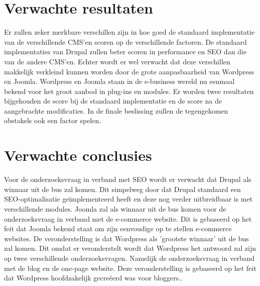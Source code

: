 \section{Verwachte resultaten}
\label{sec:verwachte_resultaten}
Er zullen zeker merkbare verschillen zijn in hoe goed de standaard implementatie van de verschillende CMS'en scoren op de verschillende factoren. De standaard implementaties van Drupal zullen beter scoren in performance en SEO dan die van de andere CMS'en. Echter wordt er wel verwacht dat deze verschillen makkelijk verkleind kunnen worden door de grote aanpasbaarheid van Wordpress en Joomla. Wordpress en Joomla staan in de e-business wereld nu eenmaal bekend voor het groot aanbod in plug-ins en modules. Er worden twee resultaten bijgehouden de score bij de standaard implementatie en de score na de aangebrachte modificaties. In de finale beslissing zullen de tegengekomen obstakels ook een factor spelen.


\section{Verwachte conclusies}
\label{sec:verwachte_conclusies}

Voor de onderzoeksvraag in verband met SEO wordt er verwacht dat Drupal als winnaar uit de bus zal komen. Dit simpelweg door dat Drupal standaard een SEO-optimalisatie geïmplementeerd heeft en deze nog verder uitbreidbaar is met verschillende modules. Joomla zal als winnaar uit de bus komen voor de onderzoeksvraag in verband met de e-commerce website. Dit is gebaseerd op het feit dat Joomla bekend staat om zijn eenvoudige op te stellen e-commerce websites. De veronderstelling is dat Wordpress als 'grootste winnaar' uit de bus zal komen. Dit omdat er veronderstelt wordt dat Wordpress het antwoord zal zijn op twee verschillende onderzoeksvragen. Namelijk de onderzoeksvraag in verband met de blog en de one-page website. Deze veronderstelling is gebaseerd op het feit dat Wordpress hoofdzakelijk gecreëerd was voor bloggers..

